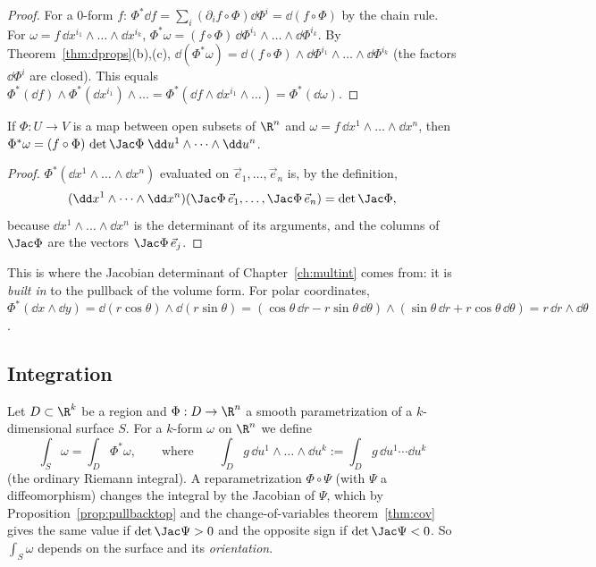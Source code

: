 \begin{proof}
For a $0$-form $f$: $\Phi^*\dd f=\sum_i(\partial_if\circ\Phi)\dd\Phi^i=\dd(f\circ\Phi)$ by the chain rule. For $\omega=f\,\dd x^{i_1}\wedge\dots\wedge\dd x^{i_k}$, $\Phi^*\omega=(f\circ\Phi)\,\dd\Phi^{i_1}\wedge\dots\wedge\dd\Phi^{i_k}$. By Theorem~\ref{thm:dprops}(b),(c), $\dd(\Phi^*\omega)=\dd(f\circ\Phi)\wedge\dd\Phi^{i_1}\wedge\dots\wedge\dd\Phi^{i_k}$ (the factors $\dd\Phi^{i}$ are closed). This equals $\Phi^*(\dd f)\wedge\Phi^*(\dd x^{i_1})\wedge\dots=\Phi^*(\dd f\wedge\dd x^{i_1}\wedge\dots)=\Phi^*(\dd\omega)$.
\end{proof}

\begin{proposition}\label{prop:pullbacktop}
If $\Phi:U\to V$ is a map between open subsets of $\R^n$ and $\omega=f\,\dd x^1\wedge\dots\wedge\dd x^n$, then $\Phi^*\omega=(f\circ\Phi)\,\det\Jac\Phi\;\dd u^1\wedge\dots\wedge\dd u^n$.
\end{proposition}

\begin{proof}
$\Phi^*(\dd x^1\wedge\dots\wedge\dd x^n)$ evaluated on $\vec e_1,\dots,\vec e_n$ is, by the definition,
\[
(\dd x^1\wedge\dots\wedge\dd x^n)(\Jac\Phi\,\vec e_1,\dots,\Jac\Phi\,\vec e_n)=\det\Jac\Phi,
\]
because $\dd x^1\wedge\dots\wedge\dd x^n$ is the determinant of its arguments, and the columns of $\Jac\Phi$ are the vectors $\Jac\Phi\,\vec e_j$.
\end{proof}

This is where the Jacobian determinant of Chapter~\ref{ch:multint} comes from: it is \emph{built in} to the pullback of the volume form. For polar coordinates, $\Phi^*(\dd x\wedge\dd y)=\dd(r\cos\theta)\wedge\dd(r\sin\theta)=(\cos\theta\,\dd r-r\sin\theta\,\dd\theta)\wedge(\sin\theta\,\dd r+r\cos\theta\,\dd\theta)=r\,\dd r\wedge\dd\theta$.

\subsection{Integration}

Let $D\subset\R^k$ be a region and $\Phi:D\to\R^n$ a smooth parametrization of a $k$-dimensional surface $S$. For a $k$-form $\omega$ on $\R^n$ we define
\[
\int_S\omega=\int_D\Phi^*\omega,\qquad\text{where}\qquad\int_Dg\,\dd u^1\wedge\dots\wedge\dd u^k:=\int_Dg\,\dd u^1\cdots\dd u^k
\]
(the ordinary Riemann integral). A reparametrization $\Phi\circ\Psi$ (with $\Psi$ a diffeomorphism) changes the integral by the Jacobian of $\Psi$, which by Proposition~\ref{prop:pullbacktop} and the change-of-variables theorem~\ref{thm:cov} gives the same value if $\det\Jac\Psi>0$ and the opposite sign if $\det\Jac\Psi<0$. So $\int_S\omega$ depends on the surface and its \emph{orientation}.

